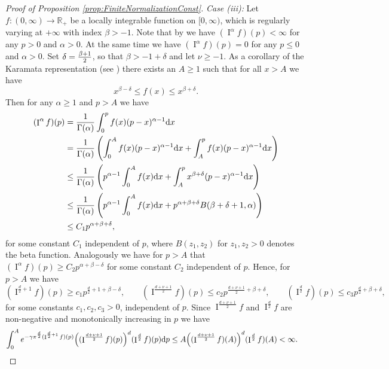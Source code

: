 \documentclass[11pt,a4paper]{article}
\theoremstyle{plain}
\theoremstyle{definition}
\theoremstyle{remark}
\def\RR{\mathbb{R}}
\newcommand{\dd}{{\rm d}}
\newcommand{\frI}{\mathop{\mathrm{I}}\nolimits}
\begin{document}
\begin{proof}[Proof of Proposition \ref{prop:FiniteNormalizationConst}]
    \textit{Case (iii):} Let $f\colon(0,\infty) \to \RR_+$ be a locally integrable function on $[0,\infty)$, which is regularly varying at $+\infty$ with index $\beta>-1$. Note that by \cite[Lemma 2.1]{MARTINEZ1992111} we have $(\frI^{\alpha}f)(p)<\infty$ for any $p>0$ and $\alpha>0$. At the same time we have $(\frI^{\alpha}f)(p)=0$ for any $p\leq 0$ and $\alpha>0$. Set $\delta={\beta+1\over 2}$, so that $\beta>-1+\delta$ and let $\nu \ge -1$. As a corollary of the Karamata representation (see \cite[p.17]{resnick_ERVPP}) there exists an $A\ge 1$ such that for all $x>A$ we have 
    \[
        x^{\beta-\delta}\le f(x) \le x^{\beta+\delta}.
    \]
    Then for any $\alpha\ge 1$ and $p> A$ we have
    \begin{align*}
        (\frI^{\alpha}f)(p)&=\frac{1}{\Gamma(\alpha)} \int_{0}^{p} f(x)(p-x)^{\alpha-1} \dd x \\
        &=\frac{1}{\Gamma(\alpha)} \left(\int_{0}^{A} f(x)(p-x)^{\alpha-1} \dd x+\int_{A}^{p} f(x)(p-x)^{\alpha-1} \dd x\right)\\
        & \le \frac{1}{\Gamma(\alpha)} \left(p^{\alpha-1}\int_{0}^{A}f(x)\dd x+\int_{A}^{p}x^{\beta+\delta}(p-x)^{\alpha-1}\dd x\right) \\
        & \le \frac{1}{\Gamma(\alpha)} \left(p^{\alpha-1}\int_{0}^{A}f(x)\dd x+p^{\alpha+\beta+\delta}B(\beta+\delta+1,\alpha)\right)\\
        &\le C_1 p^{\alpha+\beta+\delta}, 
    \end{align*} 
    for some constant $C_1$ independent of $p$, where $B(z_1,z_2)$ for $z_1,z_2>0$ denotes the beta function. Analogously we have for $p>A$ that $(\frI^{\alpha}f)(p) \ge C_2 p^{\alpha+\beta-\delta}$ for some constant $C_2$ independent of $p$. Hence, for $p>A$ we have 
    \begin{equation}\label{eq:19.03.24_2}
        (\frI^{\frac{d}{2}+1}f)(p) \ge c_1 p^{\frac{d}{2}+1+\beta-\delta},\qquad (\frI^{\frac{d+\nu+1}{2}}f)(p) \le c_2 p^{\frac{d+\nu+1}{2}+\beta+\delta},\qquad (\frI^{\frac{d}{2}}f)(p) \le c_3 p^{\frac{d}{2}+\beta+\delta},
    \end{equation} 
    for some constants $c_1,c_2,c_3>0$, independent of $p$. Since $\frI^{\frac{d+\nu+1}{2}}f$ and $\frI^{\frac{d}{2}}f$ are non-negative and monotonically increasing in $p$ we have
    \begin{align}
        \int_{0}^{A} e^{-\gamma\pi^{\frac{d}{2}}(\frI^{\frac{d}{2}+1}f)(p)} &\Big((\frI^{{d+\nu+1\over 2}}f)(p)\Big)^d(\frI^{{d\over 2}}f)(p) \dd p\le A\Big((\frI^{{d+\nu+1\over 2}}f)(A)\Big)^d(\frI^{{d\over 2}}f)(A)  < \infty.\label{eq:19.03.24_3}

\end{align}
\end{proof}
\end{document}
